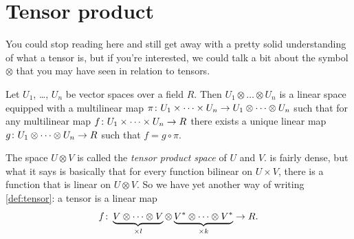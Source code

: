 \documentclass[english, 12pt]{article}
\begin{document}


\section{Tensor product}%
\label{sec:tensor_product}

You could stop reading here and still get away with a pretty solid understanding of what a tensor is, but if you're interested, we could talk a bit about the symbol $\otimes$ that you may have seen in relation to tensors.

\begin{definition}\label{def:tensor_product}
	Let $U_1$, \dots, $U_n$ be vector spaces over a field $R$.
	Then $U_1 \otimes \dots \otimes U_n$ is a linear space equipped with a multilinear map $\pi \colon U_1 \times \dots \times U_n \to U_1 \otimes \dots \otimes U_n$ such that for any multilinear map $f \colon U_1 \times \dots \times U_n \to R$ there exists a unique linear map $g \colon U_1 \otimes \dots \otimes U_n \to R$ such that $f = g \circ \pi$.
\end{definition}

The space $U \otimes V$ is called the \emph{tensor product space} of $U$ and $V$.
 is fairly dense, but what it says is basically that for every function bilinear on $U \times V$, there is a function that is linear on $U \otimes V$.
So we have yet another way of writing \cref{def:tensor}: a tensor is a linear map
\begin{align*}
	f \colon \underbrace{V \otimes \dots \otimes V}_{\times l} \otimes \underbrace{{V}^{*} \otimes \dots \otimes {V}^{*}}_{\times k} \to R.
\end{align*}
\end{document}
